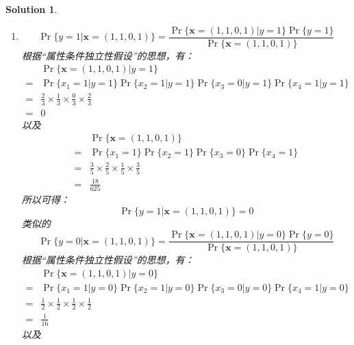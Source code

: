\documentclass[a4paper,UTF8]{article}
\numberwithin{equation}{section}
\newtheorem*{mySol}{Solution}
\begin{document}
\begin{mySol}
	~\\
\begin{enumerate}[ {(}1{)}]
\item 
\begin{equation}
\Pr\{ y=1 | \mathbf{x}=(1,1,0,1) \} = \frac{\Pr\{\mathbf{x}=(1,1,0,1) | y=1  \} \Pr\{y=1\}}{\Pr\{\mathbf{x}=(1,1,0,1) \}}
\end{equation}
根据“属性条件独立性假设”的思想，有：
\begin{equation}
\begin{aligned}
&\Pr\{\mathbf{x}=(1,1,0,1) | y=1  \}\\ 
=& \Pr\{x_1 = 1 | y = 1\}\Pr\{x_2 = 1 | y = 1\}\Pr\{x_3 = 0 | y = 1\}\Pr\{x_4 = 1 | y = 1\}\\
=& \frac{2}{3}\times\frac{1}{3}\times\frac{0}{3}\times\frac{2}{3}\\
=& 0
\end{aligned}
\end{equation}
以及
\begin{equation}
\begin{aligned}
&\Pr\{\mathbf{x}=(1,1,0,1)\}\\ 
=& \Pr\{x_1 = 1\}\Pr\{x_2 = 1\}\Pr\{x_3 = 0\}\Pr\{x_4 = 1\}\\
=& \frac{3}{5}\times\frac{2}{5}\times\frac{1}{5}\times\frac{3}{5}\\
=& \frac{18}{625}
\end{aligned}
\end{equation}
所以可得：
\begin{equation}
\Pr\{ y=1 | \mathbf{x}=(1,1,0,1) \} = 0
\end{equation}
类似的
\begin{equation}
\Pr\{ y=0 | \mathbf{x}=(1,1,0,1) \} = \frac{\Pr\{\mathbf{x}=(1,1,0,1) | y=0  \} \Pr\{y=0\}}{\Pr\{\mathbf{x}=(1,1,0,1) \}}
\end{equation}
根据“属性条件独立性假设”的思想，有：
\begin{equation}
\begin{aligned}
&\Pr\{\mathbf{x}=(1,1,0,1) | y=0  \}\\ 
=& \Pr\{x_1 = 1 | y = 0\}\Pr\{x_2 = 1 | y = 0\}\Pr\{x_3 = 0 | y = 0\}\Pr\{x_4 = 1 | y = 0\}\\
=& \frac{1}{2}\times\frac{1}{2}\times\frac{1}{2}\times\frac{1}{2}\\
=& \frac{1}{16}
\end{aligned}
\end{equation}
以及
\begin{equation}

\end{equation}
\end{enumerate}
\end{mySol}
\end{document}
